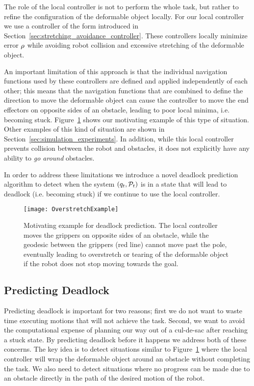 The role of the local controller is not to perform the whole task, but rather to refine the configuration of the deformable object locally. For our local controller we use a controller of the form introduced in Section~\ref{sec:stretching_avoidance_controller}. These controllers locally minimize error $\rho$ while avoiding robot collision and excessive stretching of the deformable object.

An important limitation of this approach is that the individual navigation functions used by these controllers are defined and applied independently of each other; this means that the navigation functions that are combined to define the direction to move the deformable object can cause the controller to move the end effectors on opposite sides of an obstacle, leading to poor local minima, i.e. becoming stuck. Figure~\ref{fig:overstretch_example} shows our motivating example of this type of situation. Other examples of this kind of situation are shown in Section~\ref{sec:simulation_experiments}. In addition, while this local controller prevents collision between the robot and obstacles, it does not explicitly have any ability to \textit{go around} obstacles.

In order to address these limitations we introduce a novel deadlock prediction algorithm to detect when the system $(q_t, \mathcal{P}_t)$ is in a state that will lead to deadlock (i.e. becoming stuck) if we continue to use the local controller.


\begin{figure}[t]
    \centering
    \texttt{[image: OverstretchExample]}
    \caption{Motivating example for deadlock prediction. The local controller moves the grippers on opposite sides of an obstacle, while the geodesic between the grippers (red line) cannot move past the pole, eventually leading to overstretch or tearing of the deformable object if the robot does not stop moving towards the goal.}
    \label{fig:overstretch_example}
\end{figure}

\subsection{Predicting Deadlock}
\label{sec:predicting_deadlock}

Predicting deadlock is important for two reasons; first we do not want to waste time executing motions that will not achieve the task. Second, we want to avoid the computational expense of planning our way out of a cul-de-sac after reaching a stuck state. By predicting deadlock before it happens we address both of these concerns. The key idea is to detect situations similar to Figure~\ref{fig:overstretch_example} where the local controller will wrap the deformable object around an obstacle without completing the task. We also need to detect situations where no progress can be made due to an obstacle directly in the path of the desired motion of the robot.

